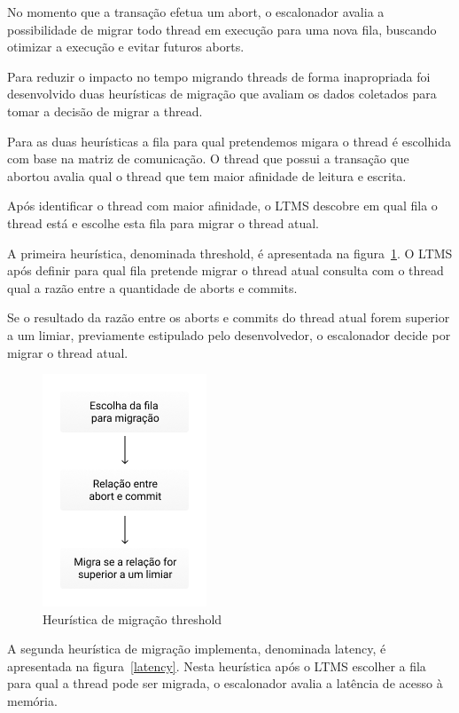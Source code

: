 \documentclass[diss,capa]{texufpel}
\begin{document}
No momento que a transação efetua um abort, o escalonador avalia a possibilidade de migrar todo thread em execução para uma nova fila, buscando otimizar a execução e evitar futuros aborts.

Para reduzir o impacto no tempo migrando threads de forma inapropriada foi desenvolvido duas heurísticas de migração que avaliam os dados coletados para tomar a decisão de migrar a thread.

Para as duas heurísticas a fila para qual pretendemos migara o thread é escolhida com base na matriz de comunicação. O thread que possui a transação que abortou avalia qual o thread que tem maior afinidade de leitura e escrita.

Após identificar o thread com maior afinidade, o LTMS descobre em qual fila o thread está e escolhe esta fila para migrar o thread atual.

A primeira heurística, denominada threshold, é apresentada na figura~\ref{threshold}. O LTMS após definir para qual fila pretende migrar o thread atual consulta com o thread qual a razão entre a quantidade de aborts e commits.

Se o resultado da razão entre os aborts e commits do thread atual forem superior a um limiar, previamente estipulado pelo desenvolvedor, o escalonador decide por migrar o thread atual.

\begin{figure}[htbp]
  \centering
  \includegraphics[scale=.8]{images/threshold.png}
\caption{Heurística de migração threshold}
\label{threshold}
\end{figure}

A segunda heurística de migração implementa, denominada latency, é apresentada na figura~\ref{latency}. Nesta heurística após o LTMS escolher a fila para qual a thread pode ser migrada, o escalonador avalia a latência de acesso à memória.
\end{document}
